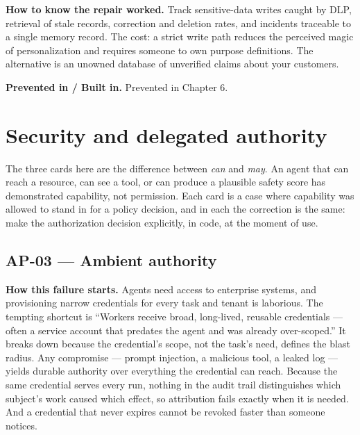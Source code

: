 \textbf{How to know the repair worked.} Track sensitive-data writes caught by DLP, retrieval of stale records, correction and deletion rates, and incidents traceable to a single memory record. The cost: a strict write path reduces the perceived magic of personalization and requires someone to own purpose definitions. The alternative is an unowned database of unverified claims about your customers.\par

\textbf{Prevented in / Built in.} Prevented in Chapter 6.\par

\section{Security and delegated authority}

The three cards here are the difference between \emph{can} and \emph{may}. An agent that can reach a resource, can see a tool, or can produce a plausible safety score has demonstrated capability, not permission. Each card is a case where capability was allowed to stand in for a policy decision, and in each the correction is the same: make the authorization decision explicitly, in code, at the moment of use.\par


\subsection{AP-03 — Ambient authority}

\textbf{How this failure starts.} Agents need access to enterprise systems, and provisioning narrow credentials for every task and tenant is laborious. The tempting shortcut is “Workers receive broad, long-lived, reusable credentials — often a service account that predates the agent and was already over-scoped.” It breaks down because the credential's scope, not the task's need, defines the blast radius. Any compromise — prompt injection, a malicious tool, a leaked log — yields durable authority over everything the credential can reach. Because the same credential serves every run, nothing in the audit trail distinguishes which subject's work caused which effect, so attribution fails exactly when it is needed. And a credential that never expires cannot be revoked faster than someone notices.\par

